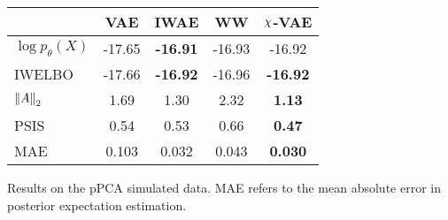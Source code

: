 \begin{small}
\begin{tabular}{lcccc}
\toprule
& \textbf{VAE} & \textbf{IWAE} & \textbf{WW} & \textbf{$\rchi$-VAE}\\
\midrule
$\log p_\theta(X)$  & -17.65 & \textbf{-16.91} & -16.93 & -16.92\\
IWELBO  & -17.66 & \textbf{-16.92} & -16.96 & \textbf{-16.92}\\
\midrule
$\left\lVert A\right\rVert_2$  & 1.69 & 1.30 & 2.32 & \textbf{1.13}\\
PSIS  & 0.54 & 0.53 & 0.66 & \textbf{0.47}\\
\midrule
MAE  & 0.103 & 0.032 & 0.043 & \textbf{0.030}\\
\bottomrule
\end{tabular}
\end{small}
\caption[Results on the pPCA simulated data]{\label{table:mixture}Results on the pPCA simulated data. MAE refers to the mean absolute error in posterior expectation estimation.}
